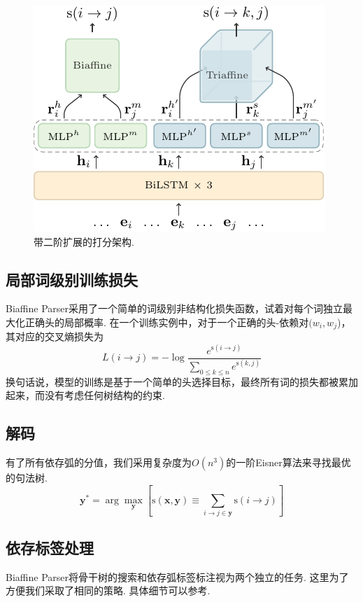 \begin{figure}[tb]
    \centering
    \includegraphics[scale=1.5]{figures/dep-framework.pdf}
    \caption{带二阶扩展的打分架构.}
    \label{fig:dep-framework}
\end{figure}

\subsection{局部词级别训练损失}
Biaffine Parser采用了一个简单的词级别非结构化损失函数，试着对每个词独立最大化正确头的局部概率.
在一个训练实例中，对于一个正确的头-依赖对$(w_i, w_j$)，其对应的交叉熵损失为
\begin{equation} \label{eq:biaffine-loss}
    \mathit{L}(i\rightarrow j) = -\log{\frac{e^{\mathrm{s}(i\rightarrow j)}}{\sum_{0 \le k \le n} e^{\mathrm{s}(k,j)}}}
\end{equation}
换句话说，模型的训练是基于一个简单的头选择目标，最终所有词的损失都被累加起来，而没有考虑任何树结构的约束.

\subsection{解码}
有了所有依存弧的分值，我们采用复杂度为$O(n^3)$的一阶Eisner算法来寻找最优的句法树.
\begin{equation}
    \label{eq:map-decoding}
    {\boldsymbol{y}}^* = \arg\max_{\boldsymbol{y}} \left[ \mathrm{s}(\boldsymbol{x},\boldsymbol{y}) \equiv
        \sum_{i \rightarrow j \in \boldsymbol{y}}{\mathrm{s}(i\rightarrow j)} \right]
\end{equation}

\subsection{依存标签处理}\label{sub@sec:dep-crf-labeling}
Biaffine Parser将骨干树的搜索和依存弧标签标注视为两个独立的任务.
这里为了方便我们采取了相同的策略. 具体细节可以参考\cite{dozat-etal-2017-biaffine}.

